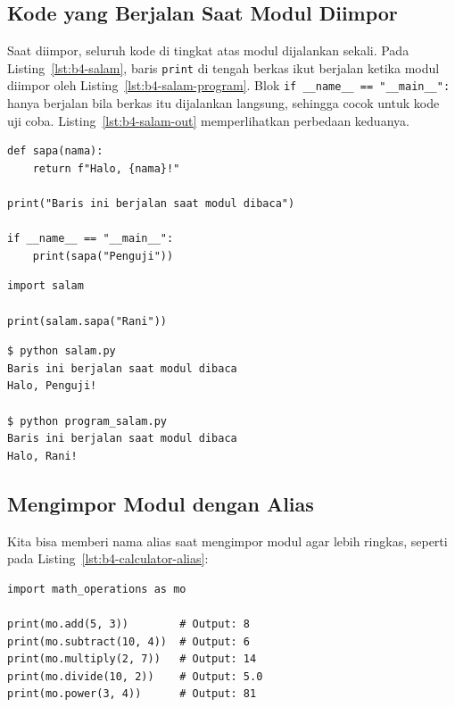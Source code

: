 \subsection{Kode yang Berjalan Saat Modul Diimpor}
Saat diimpor, seluruh kode di tingkat atas modul dijalankan sekali. Pada Listing~\ref{lst:b4-salam}, baris \texttt{print} di tengah berkas ikut berjalan ketika modul diimpor oleh Listing~\ref{lst:b4-salam-program}. Blok \texttt{if __name__ == "__main__":} hanya berjalan bila berkas itu dijalankan langsung, sehingga cocok untuk kode uji coba. Listing~\ref{lst:b4-salam-out} memperlihatkan perbedaan keduanya.

\begin{lstlisting}[style=PythonStyle, caption={Kode Python: salam.py}, label={lst:b4-salam}]
def sapa(nama):
    return f"Halo, {nama}!"

print("Baris ini berjalan saat modul dibaca")

if __name__ == "__main__":
    print(sapa("Penguji"))
\end{lstlisting}

\begin{lstlisting}[style=PythonStyle, caption={Kode Python: program_salam.py}, label={lst:b4-salam-program}]
import salam

print(salam.sapa("Rani"))
\end{lstlisting}

\begin{lstlisting}[language=bash, caption={Keluaran saat salam.py dan program_salam.py dijalankan}, label={lst:b4-salam-out}]
$ python salam.py
Baris ini berjalan saat modul dibaca
Halo, Penguji!

$ python program_salam.py
Baris ini berjalan saat modul dibaca
Halo, Rani!
\end{lstlisting}

\subsection{Mengimpor Modul dengan Alias}

Kita bisa memberi nama alias saat mengimpor modul agar lebih ringkas, seperti pada Listing~\ref{lst:b4-calculator-alias}:

\begin{lstlisting}[style=PythonStyle, caption={Kode Python: calculator.py dengan alias}, label={lst:b4-calculator-alias}]
import math_operations as mo

print(mo.add(5, 3))        # Output: 8
print(mo.subtract(10, 4))  # Output: 6
print(mo.multiply(2, 7))   # Output: 14
print(mo.divide(10, 2))    # Output: 5.0
print(mo.power(3, 4))      # Output: 81
\end{lstlisting}

